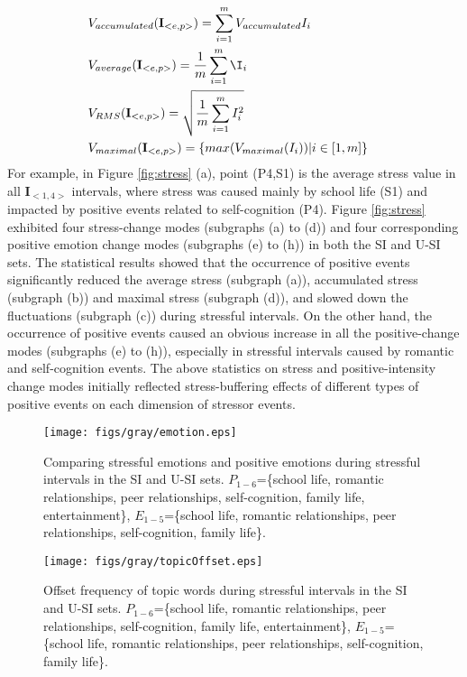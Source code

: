 \documentclass[5p,times,numbers,authoryear]{elsarticle}
\begin{document}
\begin{equation}
\begin{aligned}
& V_{accumulated}(\textbf{I}_{<e,p>})=\sum_{i=1}^m{V_{accumulated}I_i}&\\
& V_{average}(\textbf{I}_{<e,p>})=\frac{1}{m}\sum_{i=1}^m\I_i&\\
& V_{RMS}(\textbf{I}_{<e,p>})=\sqrt{\frac{1}{m}\sum_{i=1}^mI_i^2}&\\
& V_{maximal}(\textbf{I}_{<e,p>}) = \{max(V_{maximal}(I_i))|i\in[1,m]\} &
 \end{aligned}
 \end{equation}
For example, in Figure \ref{fig:stress} (a), point (P4,S1) is the average stress value in all $\textbf{I}_{<1,4>}$ intervals,
where stress was caused mainly by school life (S1) and impacted by positive events related to self-cognition (P4).
Figure \ref{fig:stress} exhibited four stress-change modes (subgraphs (a) to (d))
and four corresponding positive emotion change modes (subgraphs (e) to (h)) in both the SI and U-SI sets.
The statistical results showed that the occurrence of positive events significantly
reduced the 
{average stress (subgraph (a))}, 
accumulated stress (subgraph (b)) and maximal stress (subgraph (d)),
and slowed down the fluctuations (subgraph (c)) during stressful intervals.
On the other hand,
the occurrence of positive events caused an obvious increase in all the positive-change modes (subgraphs (e) to (h)),
especially in stressful intervals caused by romantic and self-cognition events.
The above statistics on stress and positive-intensity change modes
initially reflected stress-buffering effects of different types of positive events on each dimension of stressor events.

\begin{figure}[h]
\centering
\texttt{[image: figs/gray/emotion.eps]}
\caption{\small{Comparing stressful emotions and positive emotions during stressful intervals in the SI and U-SI sets.
$P_{1-6}$=\{school life, romantic relationships, peer relationships, self-cognition, family life, entertainment\},
$E_{1-5}$=\{school life, romantic relationships, peer relationships, self-cognition, family life\}.
}}
\label{fig:topicAll}
\end{figure}

\begin{figure}[h]
\centering
\texttt{[image: figs/gray/topicOffset.eps]}
\caption{\small{Offset frequency of topic words during stressful intervals in the SI and U-SI sets.
$P_{1-6}$=\{school life, romantic relationships, peer relationships, self-cognition, family life, entertainment\},
$E_{1-5}$=\{school life, romantic relationships, peer relationships, self-cognition, family life\}.}}
\label{fig:stopic}
\end{figure}
\end{document}
